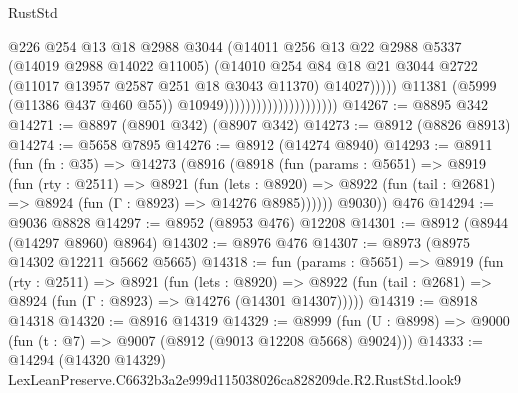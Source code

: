 \begin{lexlean}{RustStd}
\begin{coremodule}
                                                    @226
                                                    @254
                                                    @13
                                                    @18
                                                    @2988
                                                    @3044
                                                    (@14011
                                                      @256
                                                      @13
                                                      @22
                                                      @2988
                                                      @5337
                                                      (@14019 @2988 @14022 @11005)
                                                      (@14010
                                                        @254
                                                        @84
                                                        @18
                                                        @21
                                                        @3044
                                                        @2722
                                                        (@11017 @13957 @2587 @251 @18 @3043 @11370)
                                                        @14027)))))
                                              @11381
                                              (@5999 (@11386 @437 @460 @55))
                                              @10949)))))))))))))))))))))
@14267 := @8895 @342
@14271 := @8897 (@8901 @342) (@8907 @342)
@14273 := @8912 (@8826 @8913)
@14274 := @5658 @7895
@14276 := @8912 (@14274 @8940)
@14293 := @8911
    (fun (fn : @35) =>
    @14273
      (@8916
        (@8918
          (fun (params : @5651) =>
          @8919
            (fun (rty : @2511) =>
            @8921
              (fun (lets : @8920) =>
              @8922 (fun (tail : @2681) => @8924 (fun (Γ : @8923) => @14276 @8985))))))
        @9030))
    @476
@14294 := @9036 @8828
@14297 := @8952 (@8953 @476) @12208
@14301 := @8912 (@8944 (@14297 @8960) @8964)
@14302 := @8976 @476
@14307 := @8973 (@8975 @14302 @12211 @5662 @5665)
@14318 := fun (params : @5651) =>
  @8919
    (fun (rty : @2511) =>
    @8921
      (fun (lets : @8920) =>
      @8922 (fun (tail : @2681) => @8924 (fun (Γ : @8923) => @14276 (@14301 @14307)))))
@14319 := @8918 @14318
@14320 := @8916 @14319
@14329 := @8999
    (fun (U : @8998) => @9000 (fun (t : @7) => @9007 (@8912 (@9013 @12208 @5668) @9024)))
@14333 := @14294 (@14320 @14329) LexLeanPreserve.C6632b3a2e999d115038026ca828209de.R2.RustStd.look9

\end{coremodule}
\end{lexlean}
